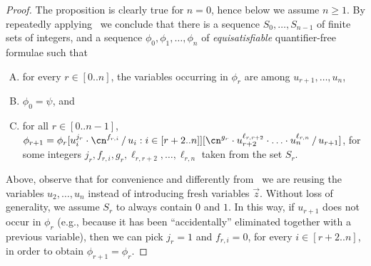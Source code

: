 \begin{proof}
  The proposition is clearly true for $n = 0$, hence below we assume $n \geq 1$.
  By repeatedly applying~ we
  conclude that there is a sequence $S_0,\dots,S_{n-1}$ of finite sets of
  integers, and a sequence $\phi_0, \phi_1, \dots, \phi_n$ of
  \emph{equisatisfiable} quantifier-free formulae such that 
  \begin{enumerate}[A.]
    \item\label{pp6:itemA} for every $r \in [0..n]$, the variables occurring in $\phi_r$ are
    among $u_{r+1},\dots,u_{n}$, 
    \item\label{pp6:itemB} $\phi_0 = \psi$, and 
    \item\label{pp6:itemC} for all $r \in [0..n-1]$, $\phi_{r+1} = \phi_r\sub{u_i^{j_r} \cdot
          \cn^{f_{r,i}}}{u_i : i \in [r+2..n]}\sub{\cn^{g_r} \cdot
          u_{r+2}^{\ell_{r,r+2}} \cdot \ldots \cdot
          u_{n}^{\ell_{r,n}}}{u_{r+1}}$, for some integers
          $j_r,f_{r,i},g_r,\ell_{r,r+2},\dots,\ell_{r,n}$ taken from the
          set $S_r$.
  \end{enumerate}
  Above, observe that for convenience and differently from~
  we are reusing the variables $u_2,\dots,u_n$ instead of introducing fresh
  variables $\vec z$. Without loss of generality, we assume $S_r$ to always
  contain $0$ and $1$. In this way, if $u_{r+1}$ does not occur in $\phi_r$
  (e.g., because it has been ``accidentally'' eliminated together with a
  previous variable), then we can pick $j_r = 1$ and $f_{r,i} = 0$, for every $i
  \in [r+2..n]$, in order to obtain $\phi_{r+1} = \phi_r$.


\end{proof}

